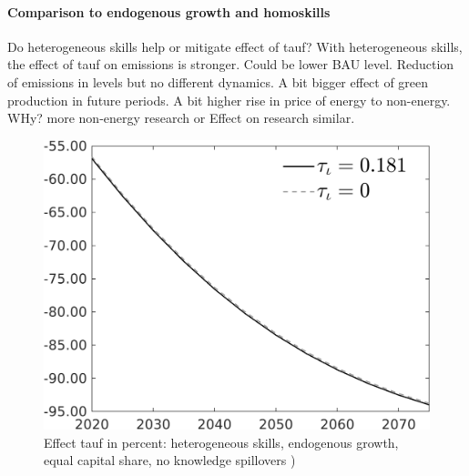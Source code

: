 \documentclass[12pt]{article}
\begin{document}
\paragraph{Comparison to endogenous growth and homoskills}
Do heterogeneous skills help or mitigate effect of tauf? 
With heterogeneous skills, the effect of tauf on emissions is stronger. Could be lower BAU level. 
Reduction of emissions in levels but no different dynamics. A bit bigger effect of green production in future periods. A bit higher rise in price of energy to non-energy. WHy? more non-energy research or 
Effect on research similar.
\begin{figure}[h!!]
	\centering
	\caption{Effect tauf in percent: heterogeneous skills, endogenous growth, equal capital share, no knowledge spillovers )}\label{fig:Leveltauf_nsk0_xgr0_equalcapShare_noknow_notaul}
	\begin{minipage}[]{0.32\textwidth}
		\includegraphics[width=1\textwidth]{../../codding_model/own_basedOnFried/optimalPol_010922_revision/figures/all_13Sept22/PerdifNoTauf_Equlab_regime0_CompTaul_Emnet_spillover0_nsk0_xgr0_knspil1_sep1_LFlimit0_emsbase0_countec0_GovRev0_etaa0.79_lgd1.png}
	\end{minipage}	
	\begin{minipage}[]{0.32\textwidth}

\end{minipage}
\end{figure}
\end{document}
